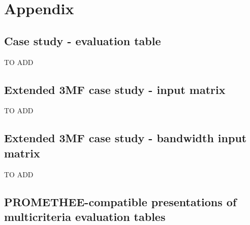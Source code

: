 \appendix
\chapter{Appendix}

\renewcommand\thesection{\Roman{section}}
\fancyhead[LO]{\bfseries\rightmark}     %

\section{Case study - evaluation table}
\label{apdx:prom804}
TO ADD

\section{Extended 3MF case study - input matrix}
\label{apdx:validinput}
TO ADD

\section{Extended 3MF case study - bandwidth input matrix}
\label{apdx:validbw}
TO ADD

\section{PROMETHEE-compatible presentations of multicriteria evaluation tables}
\label{apdx:ijmcdm}
